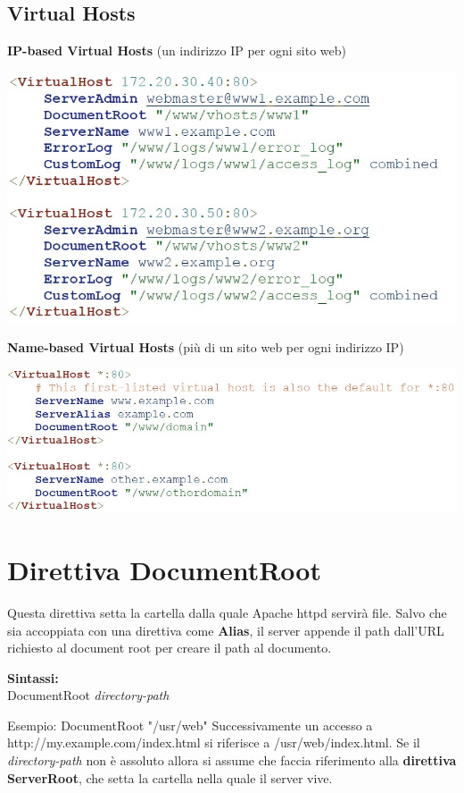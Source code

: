 \subsection{Virtual Hosts}
\textbf{IP-based Virtual Hosts} (un indirizzo IP per ogni sito web)
\begin{center}
\includegraphics[scale=0.4]{Images/TecnologieWeb/2/VirtualHost.jpg}   
\end{center}
\textbf{Name-based Virtual Hosts} (più di un sito web per ogni indirizzo IP)
\begin{center}
\includegraphics[scale=0.4]{Images/TecnologieWeb/2/VirtualHosts.jpg}  
\end{center}

\section{Direttiva DocumentRoot}
Questa direttiva setta la cartella dalla quale Apache httpd servirà file. Salvo che sia accoppiata con una direttiva come \textbf{Alias}, il server appende il path dall'URL richiesto al document root per creare il path al documento. \\
\begin{center}
    \textbf{Sintassi:}\\
    DocumentRoot \emph{directory-path}\\
\end{center}
Esempio: DocumentRoot "/usr/web"
Successivamente un accesso a http://my.example.com/index.html si riferisce a /usr/web/index.html. Se il \emph{directory-path} non è assoluto allora si assume che faccia riferimento alla \textbf{direttiva ServerRoot}, che setta la cartella nella quale il server vive. 

